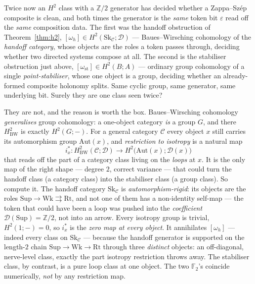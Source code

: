 \documentclass[11pt,a4paper]{book}
\theoremstyle{plain}
\theoremstyle{definition}
\theoremstyle{remark}
\begin{document}
\begin{teachbox}
Twice now an $H^{2}$ class with a $\mathbb Z/2$ generator has decided whether a
Zappa--Sz\'ep composite is clean, and both times the generator is the \emph{same} token
bit $\varepsilon$ read off the \emph{same} composition data. The first was the handoff
obstruction of Theorem~\ref{thm:h2}, $[\omega_{h}]\in H^{2}(\mathrm{Sk}_{\mathcal C};
\mathcal D)$ --- Baues--Wirsching cohomology of the \emph{handoff category}, whose objects
are the roles a token passes through, deciding whether two directed systems compose at
all. The second is the stabiliser obstruction just above,
$[\omega_{\mathrm{st}}]\in H^{2}(B;A)$ --- ordinary group cohomology of a single
\emph{point-stabiliser}, whose one object is a group, deciding whether an already-formed
composite holonomy splits. Same cyclic group, same generator, same underlying bit. Surely
they are one class seen twice?

They are not, and the reason is worth the box. Baues--Wirsching cohomology
\emph{generalises} group cohomology: a one-object category \emph{is} a group $G$, and there
$H^{2}_{\mathrm{BW}}$ is exactly $H^{2}(G;-)$. For a general category $\mathcal C$ every
object $x$ still carries its automorphism group $\mathrm{Aut}(x)$, and \emph{restriction to
isotropy} is a natural map
\[
   i_{x}^{*}\colon H^{2}_{\mathrm{BW}}(\mathcal C;\mathcal D)\longrightarrow
   H^{2}\bigl(\mathrm{Aut}(x);\mathcal D(x)\bigr)
\]
that reads off the part of a category class living on the \emph{loops} at $x$. It is the
only map of the right shape --- degree $2$, correct variance --- that could turn the
handoff class (a category class) into the stabiliser class (a group class). So compute it.
The handoff category $\mathrm{Sk}_{\mathcal C}$ is \emph{automorphism-rigid}: its objects
are the roles $\mathrm{Sup}\to\mathrm{Wk}\rightrightarrows\mathrm{Rt}$, and not one of them
has a non-identity self-map --- the token that could have been a loop was pushed into the
\emph{coefficient} $\mathcal D(\mathrm{Sup})=\mathbb Z/2$, not into an arrow. Every isotropy
group is trivial, $H^{2}(1;-)=0$, so $i_{x}^{*}$ is the \emph{zero map at every object}. It
annihilates $[\omega_{h}]$ --- indeed every class on $\mathrm{Sk}_{\mathcal C}$ --- because
the handoff generator is supported on the length-$2$ chain
$\mathrm{Sup}\to\mathrm{Wk}\to\mathrm{Rt}$ through three \emph{distinct} objects: an
off-diagonal, nerve-level class, exactly the part isotropy restriction throws away. The
stabiliser class, by contrast, is a pure loop class at one object. The two $\mathbb F_{2}$'s
coincide numerically, \emph{not} by any restriction map.


\end{teachbox}
\end{document}
